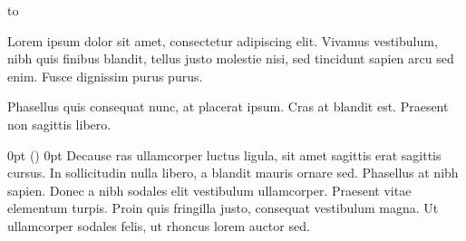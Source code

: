 



\null{}\baselineskip


\hbox to %

\baselineskip

{\rightskip 40mm
Lorem ipsum dolor sit amet, consectetur adipiscing elit. Vivamus vestibulum, nibh quis finibus blandit, tellus justo molestie nisi, sed tincidunt sapien arcu sed enim. Fusce dignissim purus purus.\par}

{\rightskip 40mm
Phasellus quis consequat nunc, at placerat ipsum. Cras at blandit est. Praesent non sagittis libero.\par}

 0pt \dimexpr(\hsize-40mm) 0pt \hsize
Decause ras 
ullamcorper luctus ligula, sit amet sagittis erat sagittis cursus. In sollicitudin nulla libero, a blandit mauris ornare sed. Phasellus at nibh sapien. Donec a nibh sodales elit vestibulum ullamcorper. Praesent vitae elementum turpis. Proin quis fringilla justo, consequat vestibulum magna. Ut ullamcorper sodales felis, ut rhoncus lorem auctor sed.
\the\mnotesize


